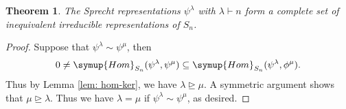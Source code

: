 \documentclass{assignment}[2019/10/15]
\theoremstyle{plain}
\newtheorem{theorem}{Theorem}[section]
\newcommand{\Hom}{\mathop{}\!\symup{Hom}}
\begin{document}
    \begin{theorem}
        The Sprecht representations $\psi^\lambda$ with $\lambda\vdash n$ form a complete set of inequivalent irreducible representations of $S_n$.
    \end{theorem}

    \begin{proof}
        Suppose that $\psi^\lambda\sim\psi^\mu$, then
        \begin{equation}
            0\neq \Hom_{S_n}(\psi^\lambda, \psi^\mu)\subseteq \Hom_{S_n}(\psi^\lambda, \phi^\mu).
        \end{equation}
        Thus by Lemma \ref{lem: hom-ker}, we have $\lambda\unrhd\mu$. A symmetric argument shows that $\mu\unrhd\lambda$. Thus we have $\lambda=\mu$ if $\psi^\lambda\sim\psi^\mu$, as desired.
    \end{proof}
\end{document}
